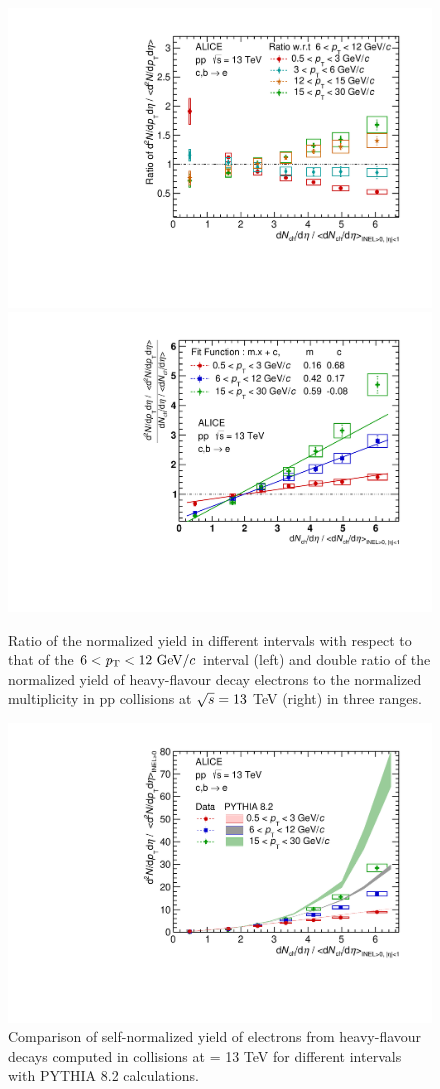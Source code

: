\begin{figure}[!h]
\includegraphics[width=0.48\linewidth]{figures/Results/HFE_ppNormalB/SNY_Pt_Ratio_0.pdf}
\includegraphics[width=0.48\linewidth]{figures/Results/HFE_ppNormalB/SNY_Fit_Diagonal_Linear.pdf}
\caption{ Ratio of the  normalized yield
in different \pt intervals with respect to that of the $6 < {\it p}_{\rm T} < 12~{\rm GeV}/c$ interval (left) and double ratio of the normalized yield of heavy-flavour decay electrons to the normalized multiplicity in pp collisions at $\sqrt{s}=13$ TeV (right) in three \pt ranges.}
\label{Fig:SNY_Ratio_pp}
\end{figure}

\begin{figure}[!h]
\centering
\includegraphics[width=0.5\linewidth]{figures/Results/HFE_ppNormalB/SNY_PYTHIA_0.pdf}
\caption{Comparison of self-normalized yield of electrons from heavy-flavour decays computed in \pp collisions at \sqrts = 13 TeV for different \pt intervals with PYTHIA 8.2 calculations.}
     \label{Fig:SelfnormalizedYield_pp_PYTHIA}
\end{figure}

